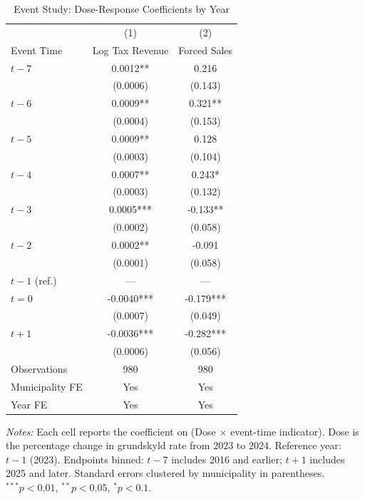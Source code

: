 \begin{table}[t]\begin{threeparttable}
\centering
\caption{Event Study: Dose-Response Coefficients by Year}
\label{tab:eventstudy}
\small
\begin{tabular}{lcc}
\toprule
  & (1) & (2) \\
  Event Time & Log Tax Revenue & Forced Sales \\
\midrule
  $t-7$ & 0.0012** & 0.216 \\
  & (0.0006) & (0.143) \\
  $t-6$ & 0.0009** & 0.321** \\
  & (0.0004) & (0.153) \\
  $t-5$ & 0.0009** & 0.128 \\
  & (0.0003) & (0.104) \\
  $t-4$ & 0.0007** & 0.243* \\
  & (0.0003) & (0.132) \\
  $t-3$ & 0.0005*** & -0.133** \\
  & (0.0002) & (0.058) \\
  $t-2$ & 0.0002** & -0.091 \\
  & (0.0001) & (0.058) \\
  $t-1$ (ref.) & --- & --- \\[3pt]
  $t=0$ & -0.0040*** & -0.179*** \\
  & (0.0007) & (0.049) \\
  $t+1$ & -0.0036*** & -0.282*** \\
  & (0.0006) & (0.056) \\
\midrule
  Observations & 980 & 980 \\
  Municipality FE & Yes & Yes \\
  Year FE & Yes & Yes \\
\bottomrule
\end{tabular}
\begin{tablenotes}
\item \textit{Notes:} Each cell reports the coefficient on (Dose $\times$ event-time indicator). Dose is the percentage change in grundskyld rate from 2023 to 2024. Reference year: $t-1$ (2023). Endpoints binned: $t-7$ includes 2016 and earlier; $t+1$ includes 2025 and later. Standard errors clustered by municipality in parentheses. $^{***}p<0.01$, $^{**}p<0.05$, $^{*}p<0.1$.
\end{tablenotes}
\end{threeparttable}\end{table}
